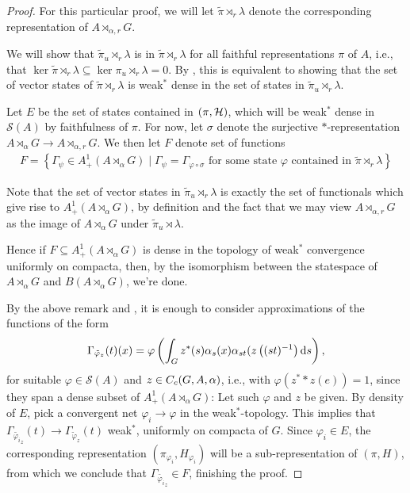 \begin{proof}
	For this particular proof, we will let $\tilde \pi \rtimes_r \lambda$ denote the corresponding representation of $A \rtimes_{\alpha,r}G$.

	We will show that $\tilde \pi_u \rtimes_r \lambda$ is  in $\tilde \pi \rtimes_r \lambda$ for all faithful representations $\pi$ of $A$, i.e., that $\ker \tilde \pi \rtimes_r \lambda \subseteq \ker \pi_u \rtimes_r \lambda = 0$. By \cite[80]{dixmier1969c}, this is equivalent to showing that the set of vector states of $\tilde \pi \rtimes_r \lambda$ is weak$^*$ dense in the set of states in $\tilde \pi_u \rtimes_r \lambda$.

	Let $E$ be the set of states contained in $(\pi,\mathcal{H})$, which will be weak$^*$ dense in $\mathcal{S}(A)$ by faithfulness of $\pi$. For now, let $\sigma$ denote the surjective $*$-representation $A \rtimes_\alpha G \to A \rtimes_{\alpha,r}G$. We then let $F$ denote set of functions
	\begin{align*}
		F = \left\{  \Gamma_\psi \in A_+^1(A\rtimes_\alpha G) \mid \Gamma_\psi = \Gamma_{\varphi \circ \sigma} \text{ for some state } \varphi \text{ contained in } \tilde \pi \rtimes_r \lambda \right\}
	\end{align*}

	Note that the set of vector states in $\tilde \pi_u \rtimes_r \lambda$ is exactly the set of functionals which give rise to $A_+^1(A \rtimes_\alpha G)$, by definition and the fact that we may view $A \rtimes_{\alpha,r} G$ as the image of $A \rtimes_\alpha G$ under $\tilde \pi_u \rtimes \lambda$.

	Hence if $F \subseteq A_+^1(A \rtimes_\alpha G)$ is dense in the topology of weak$^*$ convergence uniformly on compacta, then, by the isomorphism between the statespace of $A \rtimes_\alpha G$ and $B(A \rtimes_\alpha G)$, we're done.

	By the above remark and , it is enough to consider approximations of the functions of the form
	\begin{align*}
		\Gamma_{\tilde \varphi_z}(t) (x) =\varphi\left( \int_G z^*(s) \alpha_s(x) \alpha_{st}(z\left( (st)^{-1} \right)\mathrm{d} s \right),
	\end{align*}
	for suitable $\varphi \in \mathcal{S}(A)$ and $z \in C_c(G,A,\alpha)$, i.e., with $\varphi(z^* \ast z(e)) = 1$, since they span a dense subset of $A_+^1(A \rtimes_\alpha G)$: Let such $\varphi$ and $z$ be given. By density of $E$, pick a convergent net $\varphi_i \to \varphi$ in the weak$^*$-topology. This implies that $\Gamma_{\tilde {\varphi_i}_z}(t) \to \Gamma_{\tilde \varphi_z}(t)$ weak$^*$, uniformly on compacta of $G$. Since $\varphi_i \in E$, the corresponding representation $(\pi_{\varphi_i},H_{\varphi_i})$ will be a sub-representation of $(\pi,H)$, from which we conclude that $\Gamma_{\tilde {\varphi_i}_z} \in F$, finishing the proof.
\end{proof}
